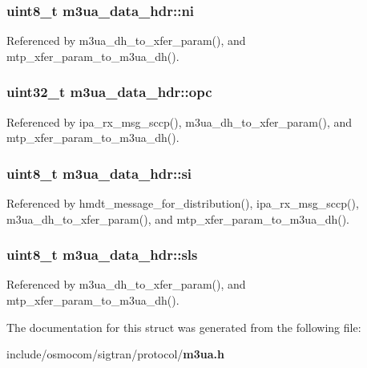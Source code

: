 \subsubsection[{ni}]{\setlength{\rightskip}{0pt plus 5cm}uint8\+\_\+t m3ua\+\_\+data\+\_\+hdr\+::ni}\label{structm3ua__data__hdr_afa2de08d9503ecd4d48d5c8b79b0463f}


Referenced by m3ua\+\_\+dh\+\_\+to\+\_\+xfer\+\_\+param(), and mtp\+\_\+xfer\+\_\+param\+\_\+to\+\_\+m3ua\+\_\+dh().

\subsubsection[{opc}]{\setlength{\rightskip}{0pt plus 5cm}uint32\+\_\+t m3ua\+\_\+data\+\_\+hdr\+::opc}\label{structm3ua__data__hdr_aab73749d4369382a869156642ee334f6}


Referenced by ipa\+\_\+rx\+\_\+msg\+\_\+sccp(), m3ua\+\_\+dh\+\_\+to\+\_\+xfer\+\_\+param(), and mtp\+\_\+xfer\+\_\+param\+\_\+to\+\_\+m3ua\+\_\+dh().

\subsubsection[{si}]{\setlength{\rightskip}{0pt plus 5cm}uint8\+\_\+t m3ua\+\_\+data\+\_\+hdr\+::si}\label{structm3ua__data__hdr_af7534d21af3bc4be0d772616a29a26de}


Referenced by hmdt\+\_\+message\+\_\+for\+\_\+distribution(), ipa\+\_\+rx\+\_\+msg\+\_\+sccp(), m3ua\+\_\+dh\+\_\+to\+\_\+xfer\+\_\+param(), and mtp\+\_\+xfer\+\_\+param\+\_\+to\+\_\+m3ua\+\_\+dh().

\subsubsection[{sls}]{\setlength{\rightskip}{0pt plus 5cm}uint8\+\_\+t m3ua\+\_\+data\+\_\+hdr\+::sls}\label{structm3ua__data__hdr_a2b8d675621b54d9fad0101191b1c26dc}


Referenced by m3ua\+\_\+dh\+\_\+to\+\_\+xfer\+\_\+param(), and mtp\+\_\+xfer\+\_\+param\+\_\+to\+\_\+m3ua\+\_\+dh().



The documentation for this struct was generated from the following file\+:\begin{DoxyCompactItemize}
\item 
include/osmocom/sigtran/protocol/{\bf m3ua.\+h}\end{DoxyCompactItemize}
